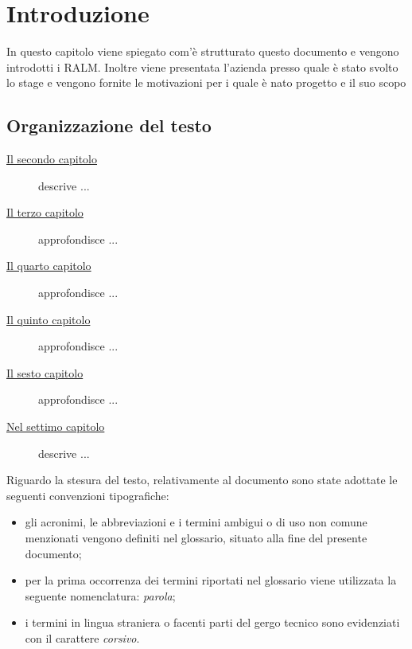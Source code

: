 \chapter{Introduzione}
\label{cap:introduzione}

In questo capitolo viene spiegato com'è strutturato questo documento e vengono introdotti i RALM.
Inoltre viene presentata l'azienda presso quale è stato svolto lo stage e vengono 
fornite le motivazioni per i quale è nato progetto e il suo scopo

\section{Organizzazione del testo}

\begin{description}
    \item[{\hyperref[cap:processi-metodologie]{Il secondo capitolo}}] descrive ...
    
    \item[{\hyperref[cap:descrizione-stage]{Il terzo capitolo}}] approfondisce ...
    
    \item[{\hyperref[cap:analisi-requisiti]{Il quarto capitolo}}] approfondisce ...
    
    \item[{\hyperref[cap:progettazione-codifica]{Il quinto capitolo}}] approfondisce ...
    
    \item[{\hyperref[cap:verifica-validazione]{Il sesto capitolo}}] approfondisce ...
    
    \item[{\hyperref[cap:conclusioni]{Nel settimo capitolo}}] descrive ...
\end{description}

Riguardo la stesura del testo, relativamente al documento sono state adottate le seguenti convenzioni tipografiche:
\begin{itemize}
	\item gli acronimi, le abbreviazioni e i termini ambigui o di uso non comune menzionati vengono definiti nel glossario, situato alla fine del presente documento; 
	\item per la prima occorrenza dei termini riportati nel glossario viene utilizzata la seguente nomenclatura: \emph{parola}\glsfirstoccur;
	\item i termini in lingua straniera o facenti parti del gergo tecnico sono evidenziati con il carattere \emph{corsivo}.
\end{itemize}

